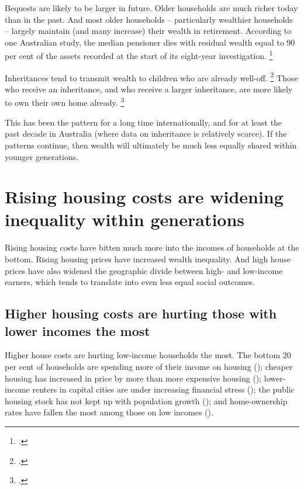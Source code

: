 Bequests are likely to be larger in future. Older households are much richer today than in the past.
And most older households -- particularly wealthier households -- largely maintain (and many increase) their wealth in retirement.
According to one Australian study, the median pensioner dies with residual wealth equal to 90 per cent of the assets recorded at the start of its eight-year investigation.%
	\footcite[][4]{WuEtAlAgePensioner2015}

Inheritances tend to transmit wealth to children who are already well-off.%
	\footcite{DaleyWoodWeidmannHarrison-2014-Wealth-of-generations}
Those who receive an inheritance, and who receive a larger inheritance, are more likely to own their own home already.%
	\footcite{Barrett-etal-2015-Intergen-xfer-housing-econ-outcomes}

This has been the pattern for a long time internationally, and for at least the past decade in Australia (where data on inheritance is relatively scarce).
If the patterns continue, then wealth will ultimately be much less equally shared within younger generations.


\section{Rising housing costs are widening inequality within generations}\label{sec:rising-house-prices-have-widened-inequality-within-generations}

Rising housing costs have bitten much more into the incomes of households at the bottom.
Rising housing prices have increased wealth inequality.
And high house prices have also widened the geographic divide between high- and low-income earners, which tends to translate into even less equal social outcomes.


\subsection{Higher housing costs are hurting those with lower incomes the most}\label{subsec:higher-house-prices-hurting-bottom}

Higher house costs are hurting low-income households the most.
The bottom 20 per cent of households are spending more of their income on housing ();
cheaper housing has increased in price by more than more expensive housing ();
lower-income renters in capital cities are under increasing financial stress ();  
the public housing stock has not kept up with population growth (); 
and home-ownership rates have fallen the most among those on low incomes ().


